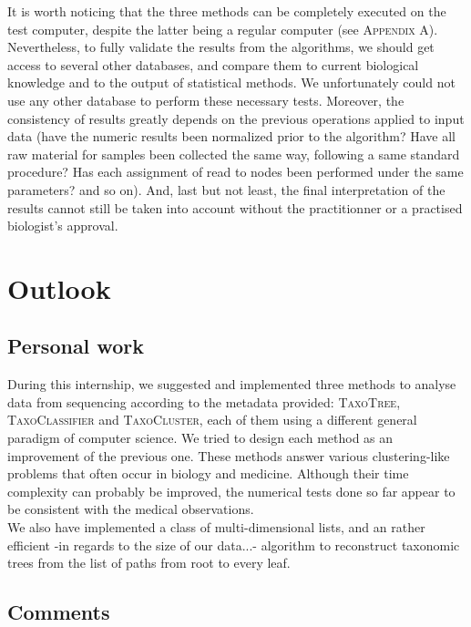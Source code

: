 \documentclass{report}
\begin{document}
It is worth noticing that the three methods can be completely executed on the test computer, despite the latter being a regular computer (see \textsc{Appendix A}). Nevertheless, to fully validate the results from the algorithms, we should get access to several other databases, and compare them to current biological knowledge and to the output of statistical methods. We unfortunately could not use any other database to perform these necessary tests. Moreover, the consistency of results greatly depends on the previous operations applied to input data (have the numeric results been normalized prior to the algorithm? Have all raw material for samples been collected the same way, following a same standard procedure? Has each assignment of read to nodes been performed under the same parameters? and so on). And, last but not least, the final interpretation of the results cannot still be taken into account without the practitionner or a practised biologist's approval.

\chapter{Outlook}

\section{Personal work}

During this internship, we suggested and implemented three methods to analyse data from sequencing according to the metadata provided: \textsc{TaxoTree}, \textsc{TaxoClassifier} and \textsc{TaxoCluster}, each of them using a different general paradigm of computer science. We tried to design each method as an improvement of the previous one. These methods answer various clustering-like problems that often occur in biology and medicine. Although their time complexity can probably be improved, the numerical tests done so far appear to be consistent with the medical observations.\\

We also have implemented a class of multi-dimensional lists, and an rather efficient -in regards to the size of our data...- algorithm to reconstruct taxonomic trees from the list of paths from root to every leaf.\\

\section{Comments}
\end{document}
